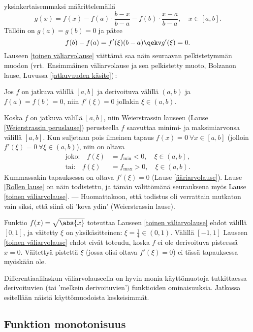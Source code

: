 yksinkertaisemmaksi määrittelemällä
\[
g(x)=f(x)-f(a)\cdot\frac{b-x}{b-a}-f(b)\cdot\frac{x-a}{b-a}, \quad x\in [a,b].
\]
Tällöin on $g(a)=g(b)=0$ ja pätee
\[
f(b)-f(a) = f'(\xi)(b-a) \qekv g'(\xi) = 0.
\]
Lauseen \ref{toinen väliarvolause} väittämä saa näin seuraavan pelkistetymmän muodon 
(vrt.\ Ensimmäinen väliarvolause ja sen pelkistetty muoto, Bolzanon lause, Luvussa 
\ref{jatkuvuuden käsite})\,:
\begin{Lause} \label{Rollen lause}  
Jos $f$ on jatkuva välillä $[a,b]$ ja derivoituva välillä $(a,b)$ ja $f(a)=f(b)=0$, niin
$f'(\xi)=0$ jollakin $\xi\in (a,b)$. 
\end{Lause}
\tod Koska $f$ on jatkuva välillä $[a,b]$, niin Weierstrassin lauseen 
(Lause \ref{Weierstrassin peruslause}) perusteella $f$ saavuttaa minimi- ja maksimiarvonsa 
välillä $[a,b]$. Kun suljetaan pois ilmeinen tapaus $f(x)=0 \ \forall x\in [a,b]$ (jolloin
$f'(\xi)=0 \ \forall \xi\in (a,b)$), niin on oltava
\begin{align*}
\text{joko:} \quad f(\xi) &= f_{\text{min}}<0, \quad \xi\in (a,b), \\
\text{tai:} \quad f(\xi) &= f_{\text{max}}>0, \quad \xi\in (a,b).
\end{align*}
Kummassakin tapauksessa on oltava $f'(\xi)=0$ (Lause \ref{ääriarvolause}). Lause 
\ref{Rollen lause} on näin todistettu, ja tämän välittömänä seurauksena myös Lause 
\ref{toinen väliarvolause}. --- Huomattakoon, että todistus oli verrattain mutkaton vain siksi, 
että siinä oli 'kova ydin' (Weierstrassin lause). \loppu
\begin{Exa} Funktio $f(x)=\sqrt{\abs{x}}$ toteuttaa Lauseen \ref{toinen väliarvolause} ehdot
välillä $[0,1]$, ja väitetty $\xi$ on yksikäsitteinen: $\xi=\tfrac{1}{4}\in(0,1)$. Välillä
$[-1,1]$ Lauseen \ref{toinen väliarvolause} ehdot eivät toteudu, koska $f$ ei ole derivoituva
pisteessä $x=0$. Väitettyä pistettä $\xi$ (jossa olisi oltava $f'(\xi)=0$) ei tässä tapauksessa
myöskään ole. \loppu
\end{Exa}
Differentiaalilaskun väliarvolauseella on hyvin monia käyttömuotoja tutkittaessa derivoituvien
(tai 'melkein derivoituvien') funktioiden ominaisuuksia. Jatkossa esitellään näistä 
käyttömuodoista keskeisimmät.

\subsection{Funktion monotonisuus}
 

